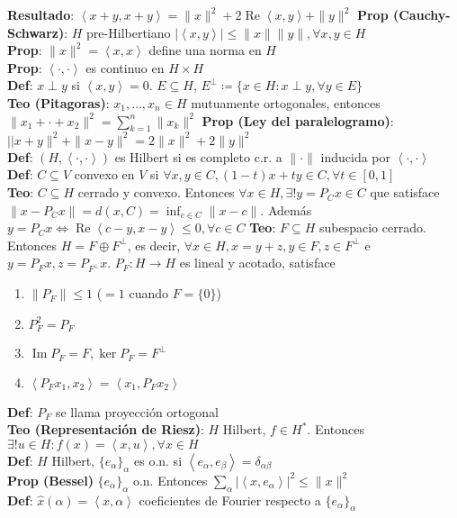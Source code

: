 \documentclass[9pt]{extarticle}
\newcommand{\inn}[1]{\left\langle #1\right\rangle}
\begin{document}
\begin{multicols*}{2}
\textbf{Resultado}: $\inn{x+y,x+y}=\|x\|^2+2\operatorname{Re}\inn{x,y}+\|y\|^2$
\textbf{Prop (Cauchy-Schwarz)}: $H$ pre-Hilbertiano $|\inn{x,y}|\leq \|x\|\|y\|,\forall x,y\in H$\\
\textbf{Prop}: $\|x\|^2=\inn{x,x}$ define una norma en $H$\\
\textbf{Prop}: $\inn{\cdot,\cdot}$ es continuo en $H\times H$\\
\textbf{Def}: $x\perp y$ si $\inn{x,y}=0$. $E\subseteq H$, $E^\perp\coloneqq \{x\in H:x\perp y,\forall y\in E\}$\\
\textbf{Teo (Pitagoras)}: $x_1,\ldots,x_n\in H$ mutuamente ortogonales, entonces $\|x_1+\cdot+x_2\|^2=\sum_{k=1}^n \|x_k\|^2$
\textbf{Prop (Ley del paralelogramo)}: $||x+y\|^2+\|x-y\|^2=2\|x\|^2+2\|y\|^2$\\
\textbf{Def}: $(H,\inn{\cdot,\cdot})$ es Hilbert si es completo c.r. a $\|\cdot\|$ inducida por $\inn{\cdot,\cdot}$\\
\textbf{Def}: $C\subseteq V$ convexo en $V$ si $\forall x,y\in C,(1-t)x+ty\in C,\forall t\in [0,1]$\\
\textbf{Teo}: $C\subseteq H$ cerrado y convexo. Entonces $\forall x\in H,\exists!y=P_Cx\in C$ que satisface $\|x-P_Cx\|=d(x,C)=\inf_{c\in C}\|x-c\|$. Además $y=P_C x\iff \operatorname{Re}\inn{c-y,x-y}\leq 0,\forall c\in C$
\textbf{Teo}: $F\subseteq H$ subespacio cerrado. Entonces $H=F\oplus F^\perp$, es decir, $\forall x\in H, x=y+z,y\in F,z\in F^\perp$ e $y=P_Fx,z=P_{F^\perp}x$. $P_F:H\to H$ es lineal y acotado, satisface
\begin{enumerate}
	\item $\|P_F\|\leq 1$ ($=1$ cuando $F=\{0\}$)
	\item $P_F^2=P_F$
	\item $\operatorname{Im} P_F=F,\ker P_F=F^\perp$
	\item $\inn{P_Fx_1,x_2}=\inn{x_1,P_F x_2}$
\end{enumerate}
\textbf{Def}: $P_F$ se llama proyección ortogonal\\
\textbf{Teo (Representación de Riesz)}: $H$ Hilbert, $f\in H^*$. Entonces $\exists!u\in H:f(x)=\inn{x,u},\forall x\in H$\\
\textbf{Def}: $H$ Hilbert, $\{e_\alpha\}_\alpha$ es o.n. si $\inn{e_\alpha,e_\beta}=\delta_{\alpha\beta}$\\
\textbf{Prop (Bessel)} $\{e_\alpha\}_\alpha$ o.n. Entonces $\sum_\alpha |\inn{x,e_\alpha}|^2\leq \|x\|^2$\\
\textbf{Def}: $\hat x(\alpha)=\inn{x,\alpha}$ coeficientes de Fourier respecto a $\{e_\alpha\}_\alpha$\\

\end{multicols*}
\end{document}
